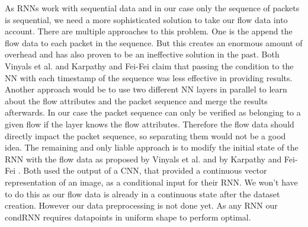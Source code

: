 \documentclass[
	ngerman,
	ruledheaders=section,%
	class=report,%
	thesis={type=bachelor},%
	accentcolor=9c,%
	custommargins=true,%
	marginpar=false,%
	parskip=half-,%
	fontsize=11pt,%
]{tudapub}
\begin{document}
As RNNs work with sequential data and in our case only the sequence of packets is sequential, we need a more sophisticated solution to take our flow data into account.
There are multiple approaches to this problem.
One is the append the flow data to each packet in the sequence.
But this creates an enormous amount of overhead and has also proven to be an ineffective solution in the past.
Both Vinyals et al. \cite{vinyalsShowTellNeural2015} and Karpathy and Fei-Fei \cite{karpathyDeepVisualSemanticAlignments2015} claim that passing the condition to the NN with each timestamp of the sequence was less effective in providing results.
Another approach would be to use two different NN layers in parallel to learn about the flow attributes and the packet sequence and merge the results afterwards.
In our case the packet sequence can only be verified as belonging to a given flow if the layer knows the flow attributes.
Therefore the flow data should directly impact the packet sequence, so separating them would not be a good idea.
The remaining and only liable approach is to modify the initial state of the RNN with the flow data as proposed by Vinyals et al. \cite{vinyalsShowTellNeural2015} and by Karpathy and Fei-Fei \cite{karpathyDeepVisualSemanticAlignments2015}.
Both used the output of a CNN, that provided a continuous vector representation of an image, as a conditional input for their RNN.
We won't have to do this as our flow data is already in a continuous state after the dataset creation.
However our data preprocessing is not done yet.
As any RNN our condRNN requires datapoints in uniform shape to perform optimal.
\end{document}
